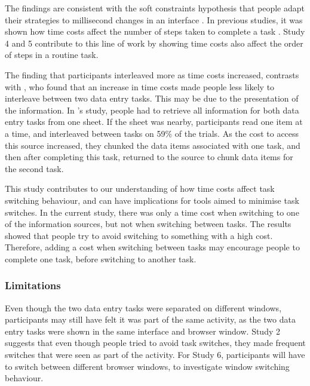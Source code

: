 The findings are consistent with the soft constraints hypothesis that people adapt their strategies to millisecond changes in an interface \citep{Charman2003, Gray2004}. In previous studies, it was shown how time costs affect the number of steps taken to complete a task \citep{Gray2006}. Study 4 and 5 contribute to this line of work by showing time costs also affect the order of steps in a routine task.

The finding that participants interleaved more as time costs increased, contrasts with \citet{Back2012}, who found that an increase in time costs made people less likely to interleave between two data entry tasks. This may be due to the presentation of the information. In \citet{Back2012}'s study, people had to retrieve all information for both data entry tasks from one sheet. If the sheet was nearby, participants read one item at a time, and interleaved between tasks on 59\% of the trials.  As the cost to access this source increased, they chunked the data items associated with one task, and then after completing this task, returned to the source to chunk data items for the second task. 


This study contributes to our understanding of how time costs affect task switching behaviour, and can have implications for tools aimed to minimise task switches. In the current study, there was only a time cost when switching to one of the information sources, but not when switching between tasks. The results showed that people try to avoid switching to something with a high cost. Therefore, adding a cost when switching between tasks may encourage people to complete one task, before switching to another task.

\subsubsection{Limitations}
Even though the two data entry tasks were separated on different windows, participants may still have felt it was part of the same activity, as the two data entry tasks were shown in the same interface and browser window. Study 2 suggests that even though people tried to avoid task switches, they  made frequent switches that were seen as part of the activity. For Study 6, participants will have to switch between different browser windows, to investigate window switching behaviour. 

